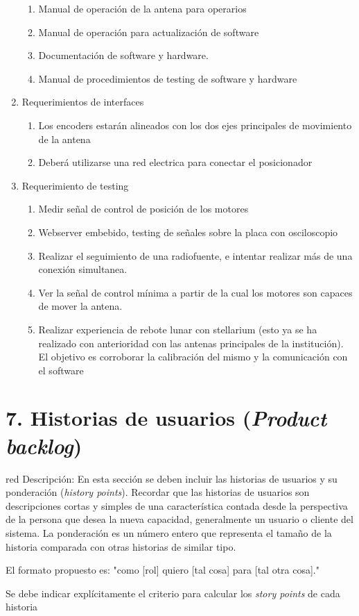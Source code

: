 \documentclass[11pt, %
codirector, %
]{charter}
\begin{document}
\begin{enumerate}
\begin{enumerate}
			\item Manual de operación de la antena para operarios 
			\item Manual de operación para actualización de software 
			\item Documentación de software y hardware. 
			\item Manual de procedimientos de testing de software y hardware	
	\end{enumerate}
	\item Requerimientos de interfaces
		\begin{enumerate}
			\item Los encoders estarán alineados con los dos ejes principales de movimiento de la antena 
			\item Deberá utilizarse una red electrica para conectar el posicionador
		\end{enumerate}
	\item Requerimiento de testing
		\begin{enumerate}
			\item Medir señal de control de posición de los motores
			\item Webserver embebido, testing de señales sobre la placa con osciloscopio
			\item Realizar el seguimiento de una radiofuente, e intentar realizar más de una conexión simultanea. 
			\item Ver la señal de control mínima a partir de la cual los motores son capaces de mover la antena. 
			\item Realizar experiencia de rebote lunar con stellarium (esto ya se ha realizado con anterioridad con las antenas principales de la institución). El objetivo es corroborar la calibración del mismo y la comunicación con el software  

		\end{enumerate}
\end{enumerate}

\section{7. Historias de usuarios (\textit{Product backlog})}
\label{sec:backlog}

\begin{consigna}{red}
Descripción: En esta sección se deben incluir las historias de usuarios y su ponderación (\textit{history points}). Recordar que las historias de usuarios son descripciones cortas y simples de una característica contada desde la perspectiva de la persona que desea la nueva capacidad, generalmente un usuario o cliente del sistema. La ponderación es un número entero que representa el tamaño de la historia comparada con otras historias de similar tipo.

El formato propuesto es: "como [rol] quiero [tal cosa] para [tal otra cosa]."

Se debe indicar explícitamente el criterio para calcular los \textit{story points} de cada historia
\end{consigna}
\end{document}
